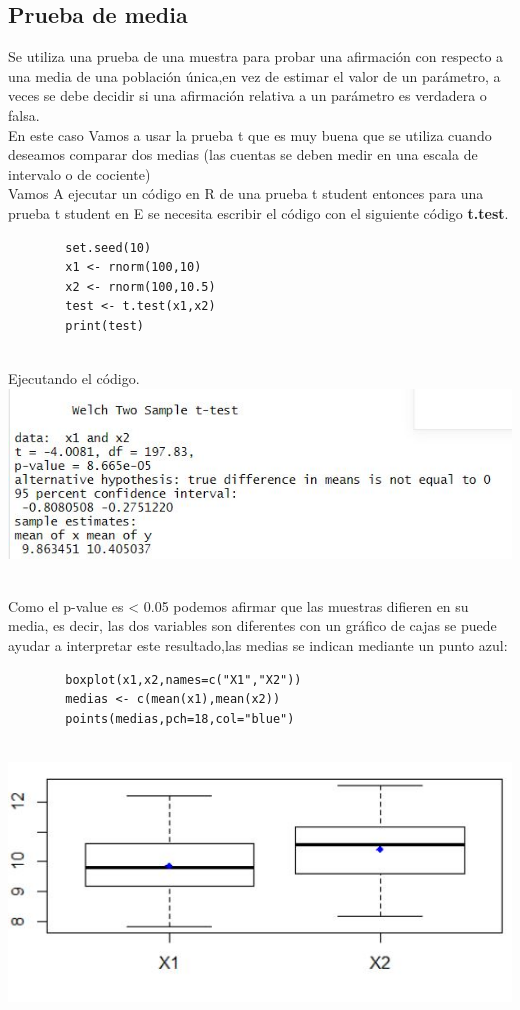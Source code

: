 \documentclass[12pt,hidelinks]{article}
\begin{document}
    \subsection{Prueba de media}
    Se utiliza una prueba de una muestra para probar una afirmación con respecto a una media de una población única,en vez de estimar el valor de un parámetro, a veces se debe decidir si una afirmación relativa a un parámetro es verdadera o falsa.
    \\ En este caso Vamos a usar la prueba t que es muy buena que se utiliza cuando deseamos comparar dos medias (las cuentas se deben medir en una escala de intervalo o de cociente)\\
    Vamos A ejecutar un código en R de una prueba t student entonces para una prueba t student en E se necesita escribir el código con el siguiente código \textbf{t.test}.
        \begin{lstlisting}
        set.seed(10)
        x1 <- rnorm(100,10) 
        x2 <- rnorm(100,10.5) 
        test <- t.test(x1,x2)
        print(test)
        \end{lstlisting}\\
        Ejecutando el código.
            \centering
            \includegraphics[scale=0.8]{t-s.JPG}\\
            \centering
            \caption{}\\
    Como el p-value es < 0.05 podemos afirmar que las muestras difieren en su media, es decir, las dos variables son diferentes con un gráfico de cajas se puede ayudar a interpretar este resultado,las medias se indican mediante un punto azul:\\   
    \begin{lstlisting}
        boxplot(x1,x2,names=c("X1","X2"))
        medias <- c(mean(x1),mean(x2))
        points(medias,pch=18,col="blue")
        \end{lstlisting}\\
            \centering
            \includegraphics[scale=0.8]{grafica-t.JPG}\\
            \centering
            \caption{}\\
\newpage
\end{document}
